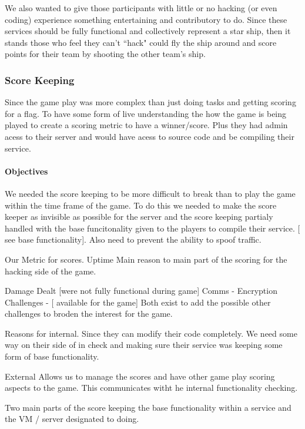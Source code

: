 \documentclass[10pt]{article}
\begin{document}
We also wanted to give those participants with little or no hacking (or even
coding) experience something entertaining and contributory to do. Since these
services should be fully functional and collectively represent a star ship, then
it stands those who feel they can't ``hack" could fly the ship around and
score points for their team by shooting the other team's ship.



\subsubsection{Score Keeping}
\label{stscorekeeping}
Since the game play was more complex than just doing tasks and getting scoring
for a flag. To have some form of live understanding the how the game is being
played to create a scoring metric to have a winner/score. Plus they had
admin acess to their server and would have acess to source code and be compiling
their service.

\paragraph{Objectives}
We needed the score keeping to be more difficult to break than to play the game 
within the time frame of the game. To do this we needed to make the score keeper
as invisible as possible for the server and the score keeping partialy handled with
the base funcitonality given to the players to compile their service. [ see base 
functionality]. Also need to prevent the ability to spoof traffic.

Our Metric for scores.
Uptime
Main reason to main part of the scoring for the hacking side of the game.

Damage Dealt [were not fully functional during game]
Comms - Encryption Challenges - [ available for the game]
Both exist to add the possible other challenges to broden the interest for the game.

Reasons for internal.
Since they can modify their code completely. We need some way on their side of
in check and making sure their service was keeping some form of base functionality.

External
Allows us to manage the scores and have other game play scoring aspects to the game.
This communicates witht he internal functionality checking.

Two main parts of the score keeping the base functionality within a service and
the VM / server designated to doing.
\end{document}
